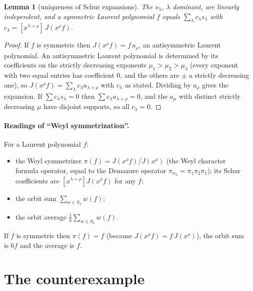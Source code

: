 \documentclass[11pt]{article}
\newtheorem{lemma}[theorem]{Lemma}
\theoremstyle{definition}
\theoremstyle{remark}
\begin{document}
\begin{lemma}[uniqueness of Schur expansions]\label{lem:unique}
The $s_\lambda$, $\lambda$ dominant, are linearly independent, and a symmetric Laurent
polynomial $f$ equals $\sum_\lambda c_\lambda s_\lambda$ with
$c_\lambda=[x^{\lambda+\rho}]\,J(x^\rho f)$.
\end{lemma}
\begin{proof}
If $f$ is symmetric then $J(x^\rho f)=f\,a_\rho$, an antisymmetric Laurent polynomial. An
antisymmetric Laurent polynomial is determined by its coefficients on the strictly decreasing
exponents $\mu_1>\mu_2>\mu_3$ (every exponent with two equal entries has coefficient $0$, and
the others are $\pm$ a strictly decreasing one), so $J(x^\rho f)=\sum_\lambda c_\lambda
a_{\lambda+\rho}$ with $c_\lambda$ as stated. Dividing by $a_\rho$ gives the expansion. If
$\sum c_\lambda s_\lambda=0$ then $\sum c_\lambda a_{\lambda+\rho}=0$, and the $a_\mu$ with
distinct strictly decreasing $\mu$ have disjoint supports, so all $c_\lambda=0$.
\end{proof}

\paragraph{Readings of ``Weyl symmetrization''.} For a Laurent polynomial $f$:
\begin{itemize}
\item[(W)] the Weyl symmetrizer $\pi(f)=J(x^\rho f)/J(x^\rho)$ (the Weyl character formula
operator, equal to the Demazure operator $\pi_{w_0}=\pi_1\pi_2\pi_1$); its Schur coefficients are
$[x^{\lambda+\rho}]J(x^\rho f)$ for any $f$;
\item[(O)] the orbit sum $\sum_{w\in S_3}w(f)$;
\item[(A)] the orbit average $\frac16\sum_{w\in S_3}w(f)$.
\end{itemize}
If $f$ is symmetric then $\pi(f)=f$ (because $J(x^\rho f)=f\,J(x^\rho)$), the orbit sum is $6f$
and the average is $f$.

\section{The counterexample}
\end{document}

